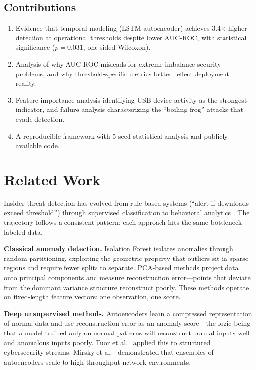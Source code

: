 \documentclass[conference]{IEEEtran}
\begin{document}
\subsection{Contributions}

\begin{enumerate}
    \item Evidence that temporal modeling (LSTM autoencoder) achieves 3.4$\times$ higher detection at operational thresholds despite lower AUC-ROC, with statistical significance ($p = 0.031$, one-sided Wilcoxon).
    \item Analysis of why AUC-ROC misleads for extreme-imbalance security problems, and why threshold-specific metrics better reflect deployment reality.
    \item Feature importance analysis identifying USB device activity as the strongest indicator, and failure analysis characterizing the ``boiling frog'' attacks that evade detection.
    \item A reproducible framework with 5-seed statistical analysis and publicly available code.
\end{enumerate}

\section{Related Work}
\label{sec:related}

Insider threat detection has evolved from rule-based systems (``alert if downloads exceed threshold'') through supervised classification to behavioral analytics \cite{salem2008survey, homoliak2019insight}. The trajectory follows a consistent pattern: each approach hits the same bottleneck---labeled data.

\textbf{Classical anomaly detection.} Isolation Forest \cite{liu2008isolation} isolates anomalies through random partitioning, exploiting the geometric property that outliers sit in sparse regions and require fewer splits to separate. PCA-based methods project data onto principal components and measure reconstruction error---points that deviate from the dominant variance structure reconstruct poorly. These methods operate on fixed-length feature vectors: one observation, one score.

\textbf{Deep unsupervised methods.} Autoencoders learn a compressed representation of normal data and use reconstruction error as an anomaly score---the logic being that a model trained only on normal patterns will reconstruct normal inputs well and anomalous inputs poorly. Tuor et al.\ \cite{tuor2017deep} applied this to structured cybersecurity streams. Mirsky et al.\ \cite{mirsky2018kitsune} demonstrated that ensembles of autoencoders scale to high-throughput network environments.
\end{document}
